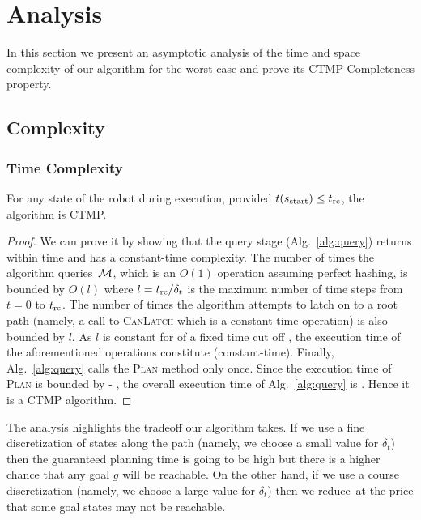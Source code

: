 \documentclass[a4paper]{report}
\begin{document}
\section{Analysis}
In this section we present an asymptotic analysis of the time and space complexity of our algorithm for the worst-case and prove its CTMP-Completeness property.

\subsection{Complexity}
\subsubsection{Time Complexity}
\label{sec:correct_conveyor}
\begin{lemma}
\label{lemma:bounded_time}
For any state \Sstart of the robot during execution, provided $t(s_{\textrm{start}}) \leq t_{\textrm{rc}}$, the algorithm is CTMP.
\end{lemma}

\begin{proof}
    We can prove it by showing that the query stage (Alg.~\ref{alg:query}) returns within \Tbound time and has a constant-time complexity.
    The number of times the algorithm queries~$\mathcal{M}$, which is an $O(1)$ operation assuming perfect hashing, is bounded by $O(l)$ where $l=t_{\textrm{rc}}/\delta_t$ is the maximum number of time steps from $t = 0$ to $t_{\textrm{rc}}$. 
    The number of times the algorithm attempts to latch on to a root path (namely, a call to \textsc{CanLatch}  which is a constant-time operation) is also bounded by $l$. 
    As $l$ is constant for of a fixed time cut off \Trc, the execution time of the aforementioned operations constitute \Tconst (constant-time).
    Finally, Alg.~\ref{alg:query} calls the \textsc{Plan} method only once.
    Since the execution time of \textsc{Plan} is bounded by \Tbound - \Tconst, the overall execution time of Alg.~\ref{alg:query} is \Tbound. Hence it is a CTMP algorithm.
\end{proof}

The analysis highlights the tradeoff our algorithm takes.
If we use a fine discretization of states along the path (namely, we choose a small value for $\delta_t$) then the guaranteed planning time \Tbound is going to be high but there is a higher chance that any goal $g$ will be reachable.
On the other hand, if we use a course discretization (namely, we choose a large value for $\delta_t$) then we reduce~\Tbound at the price that some goal states may not be reachable.
\end{document}
